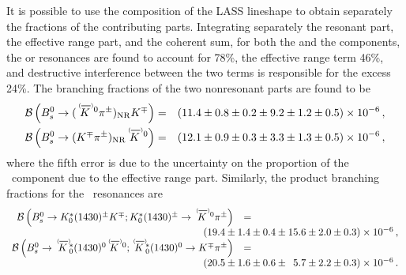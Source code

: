 It is possible to use the composition of the LASS lineshape to obtain separately the fractions of the contributing parts.
Integrating separately the resonant part, the effective range part, and the coherent sum, for both the \KpiSz and the \KpiSpm components,
the \KstarIIpm or \KstarIIzoptbar resonances are found to account for 78\%, the effective range term 46\%, and destructive interference between the two terms is responsible for the excess 24\%.
The branching fractions of the two nonresonant parts are found to be 
\begin{eqnarray*}
\Br{\Bs \to \KpiNRpm\Kmp}     &=& (11.4   \pm   0.8   \pm   0.2   \pm   9.2   \pm   1.2   \pm   0.5)  \times 10^{-6} \,, \\
\Br{\Bs \to \KpiNRz\KorKbarz} &=& (12.1   \pm   0.9   \pm   0.3   \pm   3.3   \pm   1.3   \pm   0.5)  \times 10^{-6} \,,
\end{eqnarray*}
where the fifth error is due to the uncertainty on the proportion of the \KpiS\ component due to the effective range part.
Similarly, the product branching fractions for the \KstarII\ resonances are
\begin{equation*}
\begin{array}{rcl}      
\Br{\Bs \to \KstarIIpm\Kmp; \KstarIIpm \to \KorKbarz\pipm}           &=& \\
& \multicolumn{2}{l}{\hspace{-14mm}(19.4   \pm   1.4   \pm   0.4   \pm    15.6   \pm   2.0   \pm   0.3)  \times 10^{-6} \,,} \\
\Br{\Bs \to \KstarIIzoptbar\KorKbarz; \KstarIIzoptbar \to \Kmp\pipm} &=& \\
& \multicolumn{2}{l}{\hspace{-14mm}(20.5   \pm   1.6   \pm   0.6   \pm \phz5.7   \pm   2.2   \pm   0.3)  \times 10^{-6} \,.}
\end{array}  
\end{equation*}

